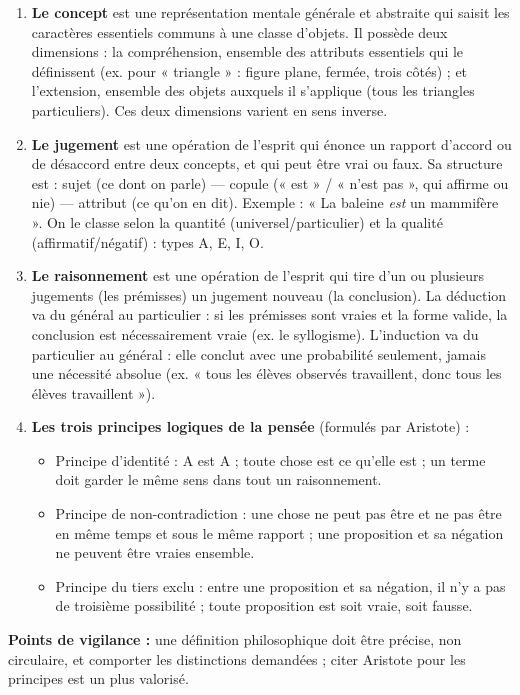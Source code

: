\documentclass[11pt]{article}
\newcommand{\cle}[1]{{\popxbold\color{popdark}#1}}
\begin{document}
\begin{corrige}
\begin{enumerate}
    \item \textbf{Le concept} est une représentation mentale générale et abstraite qui saisit les caractères essentiels communs à une classe d'objets. Il possède deux dimensions : la \cle{compréhension}, ensemble des attributs essentiels qui le définissent (ex. pour « triangle » : figure plane, fermée, trois côtés) ; et l'\cle{extension}, ensemble des objets auxquels il s'applique (tous les triangles particuliers). Ces deux dimensions varient en sens inverse.
    \item \textbf{Le jugement} est une opération de l'esprit qui énonce un rapport d'accord ou de désaccord entre deux concepts, et qui peut être vrai ou faux. Sa structure est : \cle{sujet} (ce dont on parle) — \cle{copule} (« est » / « n'est pas », qui affirme ou nie) — \cle{attribut} (ce qu'on en dit). Exemple : « La baleine \emph{est} un mammifère ». On le classe selon la quantité (universel/particulier) et la qualité (affirmatif/négatif) : types A, E, I, O.
    \item \textbf{Le raisonnement} est une opération de l'esprit qui tire d'un ou plusieurs jugements (les prémisses) un jugement nouveau (la conclusion). La \cle{déduction} va du général au particulier : si les prémisses sont vraies et la forme valide, la conclusion est nécessairement vraie (ex. le syllogisme). L'\cle{induction} va du particulier au général : elle conclut avec une probabilité seulement, jamais une nécessité absolue (ex. « tous les élèves observés travaillent, donc tous les élèves travaillent »).
    \item \textbf{Les trois principes logiques de la pensée} (formulés par Aristote) :
    \begin{itemize}
        \item \cle{Principe d'identité} : A est A ; toute chose est ce qu'elle est ; un terme doit garder le même sens dans tout un raisonnement.
        \item \cle{Principe de non-contradiction} : une chose ne peut pas être et ne pas être en même temps et sous le même rapport ; une proposition et sa négation ne peuvent être vraies ensemble.
        \item \cle{Principe du tiers exclu} : entre une proposition et sa négation, il n'y a pas de troisième possibilité ; toute proposition est soit vraie, soit fausse.
    \end{itemize}
\end{enumerate}
\textbf{Points de vigilance :} une définition philosophique doit être précise, non circulaire, et comporter les distinctions demandées ; citer Aristote pour les principes est un plus valorisé.
\end{corrige}
\end{document}
